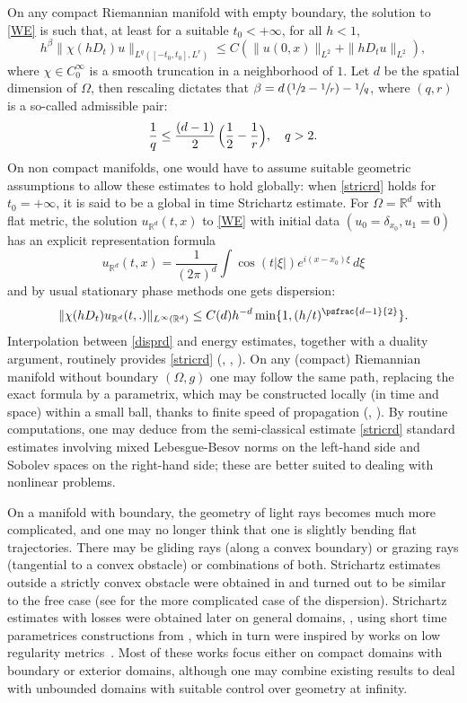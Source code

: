 On any compact Riemannian manifold with empty boundary, the solution to \eqref{WE} is such that, at least for a suitable $t_{0}<+\infty$, for all $h<1$,
\begin{equation}\label{stricrd} h^{\beta}\|\chi(hD_t)u\|_{L^q([-t_{0},t_{0}],
L^r)}\leq C\left(\|u(0,x)\|_{L^2}+\|hD_t u\|_{L^2}\right),
\end{equation}
where $\chi\in C^{\infty}_0$ is a smooth truncation in a neighborhood of $1$. Let $d$ be the spatial dimension of $\Omega$, then rescaling dictates that $\beta=d\left(\sfrac 12-\sfrac 1r\right)-\sfrac 1q$, where $(q,r)$ is a so-called admissible pair:
\begin{equation}\label{adm}
\frac 1q\leq \frac{(d-1)} 2\, \Bigl(\frac{1}{2}-\frac{1}{r}\Bigr),\quad q>2.
\end{equation}
On non compact manifolds, one would have to assume suitable geometric assumptions to allow these estimates to hold globally: when \eqref{stricrd} holds for $t_{0}=+\infty$, it is said to be a global in time Strichartz estimate. For $\Omega=\mathbb{R}^d$ with flat metric, the solution $u_{\mathbb{R}^d}(t,x)$ to
\eqref{WE} with initial data $(u_0=\delta_{x_{0}}, u_1=0)$ has an explicit representation formula
\[
u_{\mathbb{R}^d}(t,x)=\frac{1}{(2\pi)^d}\int
\cos(t|\xi|)e^{i(x-x_{0})\xi}\,d\xi
\]
and by usual stationary phase methods one gets dispersion:
\begin{equation}\label{disprd}
\|\chi(hD_t)u_{\mathbb{R}^d}(t,.)\|_{L^{\infty}(\mathbb{R}^d)}\leq
C(d) h^{-d}\min\{1, (h/t)^{\psfrac{d-1}{2}}\}.
\end{equation}
Interpolation between \eqref{disprd} and energy estimates, together with a duality argument, routinely provides
\eqref{stricrd} (\cite{Stri77}, \cite{Pe84}, \cite{GV85}). On any (compact) Riemannian manifold without boundary $(\Omega,g)$ one may follow the same path, replacing the exact formula by a parametrix, which may be constructed locally (in time and space) within a small ball, thanks to finite speed of propagation (\cite{Kapi89}, \cite{MSS93}). By routine computations, one may deduce from the semi-classical estimate \eqref{stricrd} standard estimates involving mixed Lebesgue-Besov norms on the left-hand side and Sobolev spaces on the right-hand side; these are better suited to dealing with nonlinear problems.

On a manifold with boundary, the geometry of light rays becomes much more complicated, and one may no longer think that one is slightly bending flat trajectories. There may be gliding rays (along a convex boundary) or grazing rays (tangential to a convex obstacle) or combinations of both. Strichartz estimates outside a strictly convex obstacle were obtained in \cite{smso95} and turned out to be similar to the free case (see \cite{ildispext} for the more complicated case of the dispersion). Strichartz estimates with losses were obtained later on general domains, \cite{blsmso08}, using short time parametrices constructions from \cite{smso06}, which in turn were inspired by works on low regularity metrics~\cite{tat02}. Most of these works focus either on compact domains with boundary or exterior domains, although one may combine existing results to deal with unbounded domains with suitable control over geometry at infinity.

